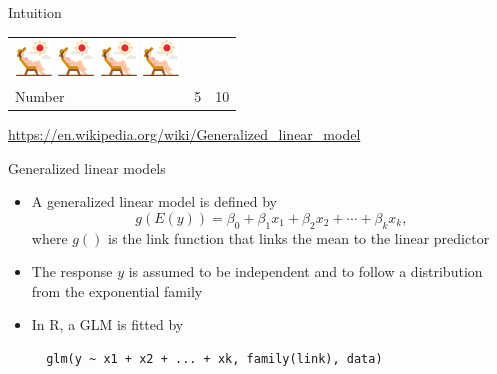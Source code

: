 \documentclass[aspectratio=169]{beamer}
\begin{document}
\begin{frame}[allowframebreaks]{Intuition}
\begin{tabular}{|l|c|c|}
    \includegraphics[width = 1cm]{../figures/tanning}
    \includegraphics[width = 1cm]{../figures/tanning}
    \includegraphics[width = 1cm]{../figures/tanning}
    \includegraphics[width = 1cm]{../figures/tanning} \\
    Number & 5  & 10 \\
    \hline
  \end{tabular}

  \vspace{.5cm}
{\scriptsize \url{https://en.wikipedia.org/wiki/Generalized_linear_model}}

\end{frame}

\begin{frame}[fragile]{Generalized linear models}
  \begin{itemize}
    \item A generalized linear model is defined by
\[
  g(E(y)) = \beta_0 + \beta_1 x_1 + \beta_2 x_2 + \cdots + \beta_k x_k,
\]
where $g()$ is the link function that links the mean to the linear predictor
\item The response $y$ is assumed to be independent and to follow a distribution
  from the exponential family

\item In R, a GLM is fitted by

  \begin{lstlisting}
  glm(y ~ x1 + x2 + ... + xk, family(link), data)
\end{lstlisting}
  \end{itemize}
\end{frame}
\end{document}
